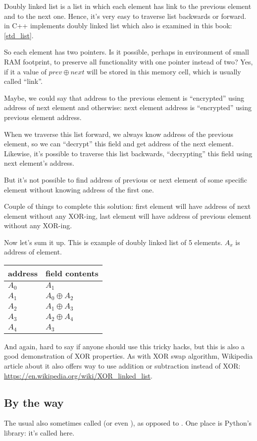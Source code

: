 Doubly linked list is a list in which each element has link to the previous element and to the next one.
Hence, it's very easy to traverse list backwards or forward.
 in C++ implements doubly linked list which also is examined in this book: \ref{std_list}.

So each element has two pointers.
Is it possible, perhaps in environment of small \ac{RAM} footprint, to preserve all functionality with one pointer instead of two?
Yes, if it a value of $prev \oplus next$ will be stored in this memory cell, which is usually called ``link''.

Maybe, we could say that address to the previous element is ``encrypted'' using address of next element and otherwise:
next element address is ``encrypted'' using previous element address.

When we traverse this list forward, we always know address of the previous element, so we can ``decrypt'' this field and get 
address of the next element.
Likewise, it's possible to traverse this list backwards, ``decrypting'' this field using next element's address.

But it's not possible to find address of previous or next element of some specific element without
knowing address of the first one.

Couple of things to complete this solution: first element will have address of next element without any XOR-ing,
last element will have address of previous element without any XOR-ing.

Now let's sum it up. This is example of doubly linked list of 5 elements.
$A_x$ is address of element.

\begin{center}
\begin{tabular}{ | l | l | }
	\hline
	\HeaderColor address & \HeaderColor \IT{link} field contents \\
	\hline
	$A_0$ & $A_1$ \\
	\hline
	$A_1$ & $A_0 \oplus A_2$ \\
	\hline
	$A_2$ & $A_1 \oplus A_3$ \\
	\hline
	$A_3$ & $A_2 \oplus A_4$ \\
	\hline
	$A_4$ & $A_3$ \\
	\hline
\end{tabular}
\end{center}

And again, hard to say if anyone should use this tricky hacks, but this is also a good demonstration of XOR properties.
As with XOR swap algorithm, Wikipedia article about it also offers way to use addition or subtraction instead of XOR:
\url{https://en.wikipedia.org/wiki/XOR_linked_list}.



\subsection{By the way}

The usual  also sometimes called  (or even ), as opposed to .
One place is  Python's library: it's called  here.

